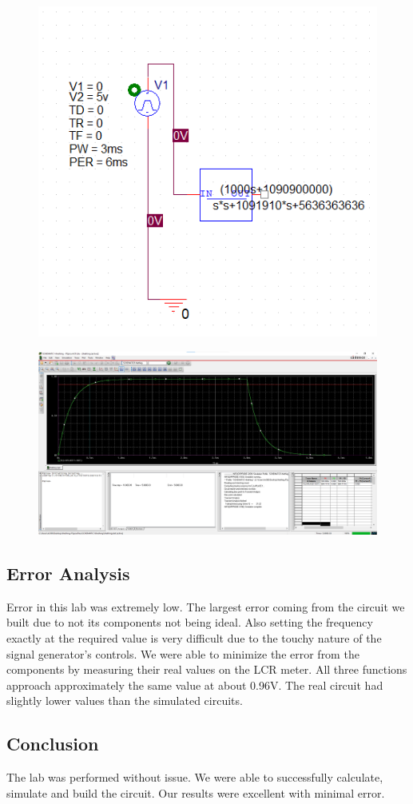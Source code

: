 \documentclass[11pt]{article}
\begin{document}
		\begin{figure}[H]
		\centering
		\includegraphics[width=5in]{images/simulation_schematic.png}
		\end{figure}
		\begin{figure}[H]
		\centering
		\includegraphics[width=5in]{images/laplace_part.png}
		\end{figure}
	

	\subsection*{Error Analysis}
	Error in this lab was extremely low. The largest error coming from the circuit we built due to not its components not being ideal. Also setting the frequency exactly at the required value is very difficult due to the touchy nature of the signal generator's controls. We were able to minimize the error from the components by measuring their real values on the LCR meter. All three functions approach approximately the same value at about 0.96V. The real circuit had slightly lower values than the simulated circuits.
	\subsection*{Conclusion}
	The lab was performed without issue. We were able to successfully calculate, simulate and build the circuit. Our results were excellent with minimal error. 
	
	
\end{document}
